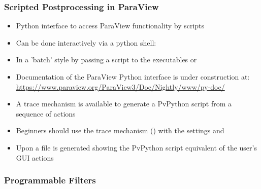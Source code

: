 \begin{frame}

  \frametitle{Scripted Postprocessing in ParaView}

  \begin{itemize}

    \item Python interface to access ParaView functionality by scripts

    \item Can be done interactively via a python shell:  

    \item In a 'batch' style by passing a script to the executables  or  

    \item Documentation of the ParaView Python interface is under construction at:
      \url{https://www.paraview.org/ParaView3/Doc/Nightly/www/py-doc/}

    \item A trace mechanism is available to generate a PvPython script from a sequence of actions

    \item Beginners should use the trace mechanism () with the settings  and  

    \item Upon  a file is generated showing the PvPython script equivalent of the user's GUI actions
  \end{itemize}

\end{frame}

\begin{frame}
  \frametitle{Programmable Filters}
\end{frame}

